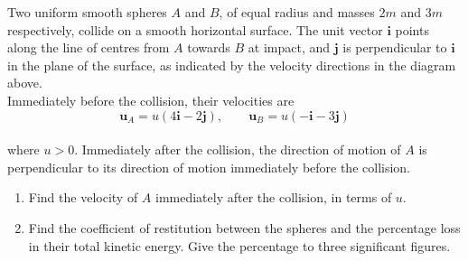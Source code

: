 \documentclass[leqno]{article}
\begin{document}
\djsFrontMatter
\begin{enumerate}[
  label=\textbf{\arabic*.},
  leftmargin=*,
  topsep=0pt,
  partopsep=0pt,
  parsep=0pt
]

\questionitem

\begin{figure}[H]
    \centering
{}
\end{figure}


Two uniform smooth spheres $A$ and $B$, of equal radius and masses $2m$ and $3m$ respectively, collide on a smooth horizontal surface. The unit vector $\mathbf{i}$ points along the line of centres from $A$ towards $B$ at impact, and $\mathbf{j}$ is perpendicular to $\mathbf{i}$ in the plane of the surface, as indicated by the velocity directions in the diagram above. \\

Immediately before the collision, their velocities are
\[
\mathbf{u}_A=u(4\mathbf{i}-2\mathbf{j}),\qquad \mathbf{u}_B=u(-\mathbf{i}-3\mathbf{j})
\] \\
where $u>0$. Immediately after the collision, the direction of motion of $A$ is perpendicular to its direction of motion immediately before the collision. \\
\begin{enumerate}[label=\textbf{(\alph*)}]
\item Find the velocity of $A$ immediately after the collision, in terms of $u$.  \\
\item Find the coefficient of restitution between the spheres and the percentage loss in their total kinetic energy. Give the percentage to three significant figures.  \\
\end{enumerate}


\end{enumerate}
\end{document}
